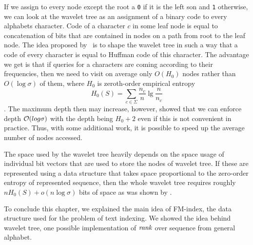 If we assign to every node except the root a {\tt 0} if it is the left son and {\tt 1}
otherwise, we can look at the wavelet tree as an assignment of a binary code to every
alphabets character. Code of a character $c$ in some leaf node is equal to concatenation of
bits that are contained in nodes on a path from root to the leaf node. The idea proposed
by~\cite{makinen2005succinct} is to shape the wavelet tree in such a way that a code of every
character is equal to Huffman code of this character. The advantage we get is that if queries
for a characters are coming according to their frequencies, then we need to visit on average
only $O(H_0)$ nodes rather than $O(\log \sigma)$ of them, where $H_0$ is zeroth-order empirical
entropy $$H_0(S)=\sum_{c\in\Sigma} \frac{n_c}{n} \lg \frac{n}{n_c}$$. The maximum depth then
may increase, however, \cite{grabowski2004first} showed that we can enforce depth
$\mathcal{O}(log \sigma)$ with the depth being $H_0+2$ even if this is not convenient in practice.
Thus, with some additional work, it is possible to speed up the average number of nodes accessed.

The space used by the wavelet tree heavily depends on the space usage of individual bit vectors
that are used to store the nodes of wavelet tree. If these are represented using a data structure
that takes space proportional to the zero-order entropy of represented sequence, then the whole
wavelet tree requires roughly $nH_0(S) + o(n\log\sigma)$ bits of space as was shown by
\cite{grossi2003high}.

To conclude this chapter, we explained the main idea of FM-index, the data structure used for the
problem of text indexing. We showed the idea behind wavelet tree, one possible implementation of
$\mathit{rank}$ over sequence from general alphabet.

